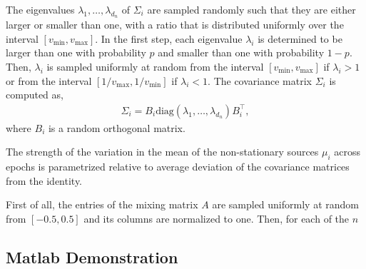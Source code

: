 \documentclass{article}
\newcommand{\1}{\ensuremath{\mathds{1}}}
\newcommand{\0}{\ensuremath{0}}
\begin{document}
The eigenvalues $\lambda_1, \ldots, \lambda_{d_n}$ of $\Sigma_i$ are sampled randomly such 
that they are either larger or smaller than one, with a ratio that is distributed uniformly 
over the interval $[v_\text{min}, v_\text{max}]$. In the first step, each eigenvalue $\lambda_i$ is
determined to be larger than one with probability $p$ and smaller than one with probability $1-p$. 
Then, $\lambda_i$ is sampled uniformly at random from the interval $[v_\text{min}, v_\text{max}]$ if 
$\lambda_i > 1$ or from the interval $[1/v_\text{max}, 1/v_\text{min}]$ if $\lambda_i < 1$. The 
covariance matrix $\Sigma_i$ is computed as, 
\begin{align*}
	\Sigma_i = B_i \text{diag}(\lambda_1, \ldots, \lambda_{d_n}) B^\top_i,
\end{align*}
where $B_i$ is a random orthogonal matrix. 

The strength of the variation in the mean of the non-stationary sources $\mu_i$ across epochs
is parametrized relative to average deviation of the covariance matrices from the identity. 






First of all, the entries of the mixing matrix $A$ are sampled 
uniformly at random from $[-0.5, 0.5]$ and its columns are normalized to one. Then, for each of the $n$ 






\subsection{Matlab Demonstration}
\end{document}
